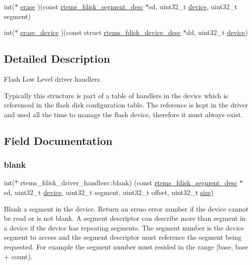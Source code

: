 \begin{DoxyCompactItemize}
\item 
int($\ast$ \mbox{\hyperlink{structrtems__fdisk__driver__handlers_aaff1b01c8f7d53fb2fd586479b155f59}{erase}} )(const \mbox{\hyperlink{structrtems__fdisk__segment__desc}{rtems\+\_\+fdisk\+\_\+segment\+\_\+desc}} $\ast$sd, uint32\+\_\+t \mbox{\hyperlink{structdevice}{device}}, uint32\+\_\+t segment)
\item 
int($\ast$ \mbox{\hyperlink{structrtems__fdisk__driver__handlers_a526623f353abfb0b0c770cb3e6c53cef}{erase\+\_\+device}} )(const struct \mbox{\hyperlink{structrtems__fdisk__device__desc}{rtems\+\_\+fdisk\+\_\+device\+\_\+desc}} $\ast$dd, uint32\+\_\+t \mbox{\hyperlink{structdevice}{device}})
\end{DoxyCompactItemize}


\subsection{Detailed Description}
Flash Low Level driver handlers. 

Typically this structure is part of a table of handlers in the device which is referenced in the flash disk configuration table. The reference is kept in the driver and used all the time to manage the flash device, therefore it must always exist. 

\subsection{Field Documentation}
\mbox{\label{structrtems__fdisk__driver__handlers_afab24fd17437d920f877eb533fb849f3}} 
\subsubsection{\texorpdfstring{blank}{blank}}
{\footnotesize\ttfamily int($\ast$ rtems\+\_\+fdisk\+\_\+driver\+\_\+handlers\+::blank) (const \mbox{\hyperlink{structrtems__fdisk__segment__desc}{rtems\+\_\+fdisk\+\_\+segment\+\_\+desc}} $\ast$sd, uint32\+\_\+t \mbox{\hyperlink{structdevice}{device}}, uint32\+\_\+t segment, uint32\+\_\+t offset, uint32\+\_\+t \mbox{\hyperlink{sun4u_2tte_8h_a245260f6f74972558f61b85227df5aae}{size}})}

Blank a segment in the device. Return an errno error number if the device cannot be read or is not blank. A segment descriptor can describe more than segment in a device if the device has repeating segments. The segment number is the device segment to access and the segment descriptor must reference the segment being requested. For example the segment number must resided in the range \mbox{[}base, base + count).



